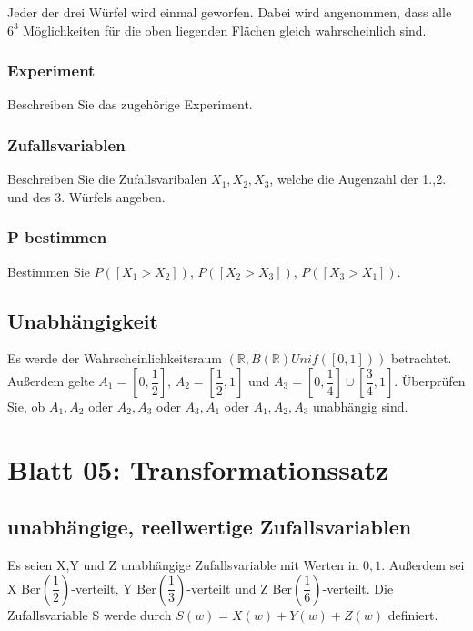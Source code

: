 \documentclass[paper=a4, fontsize=11pt]{scrartcl}
\numberwithin{equation}{section}
\numberwithin{figure}{section}
\numberwithin{table}{section}
\begin{document}
Jeder der drei Würfel wird einmal geworfen. Dabei wird angenommen, dass alle $6^{3}$ Möglichkeiten für die oben liegenden Flächen gleich wahrscheinlich sind. \\

\subsubsection{Experiment}
Beschreiben Sie das zugehörige Experiment. \\

\subsubsection{Zufallsvariablen}
Beschreiben Sie die Zufallsvaribalen $X_{1},X_{2},X_{3}$, welche die Augenzahl der 1.,2. und des 3. Würfels angeben. \\

\subsubsection{P bestimmen}
Bestimmen Sie $P([X_{1} > X_{2}])$, $P([X_{2} > X_{3}])$, $P([X_{3} > X_{1}])$. \\

\subsection{Unabhängigkeit}
Es werde der Wahrscheinlichkeitsraum $(\mathbb{R},B(\mathbb{R})Unif([0,1]))$ betrachtet. Außerdem gelte $A_{1}=[0, \dfrac{1}{2}]$, $A_{2}=[\dfrac{1}{2},1]$ und $A_{3}=[0,\dfrac{1}{4}] \cup [\dfrac{3}{4},1]$. Überprüfen Sie, ob $A_{1},A_{2}$ oder $A_{2},A_{3}$ oder $A_{3},A_{1}$ oder $A_{1},A_{2},A_{3}$ unabhängig sind. \\

\section{Blatt 05: Transformationssatz}
\subsection{unabhängige, reellwertige Zufallsvariablen}
Es seien X,Y und Z unabhängige Zufallsvariable mit Werten in ${0,1}$. Außerdem sei X Ber$(\dfrac{1}{2})$-verteilt, Y Ber$(\dfrac{1}{3})$-verteilt und Z Ber$(\dfrac{1}{6})$-verteilt. Die Zufallsvariable S werde durch $S(w)=X(w)+Y(w)+Z(w)$ definiert.
\end{document}
